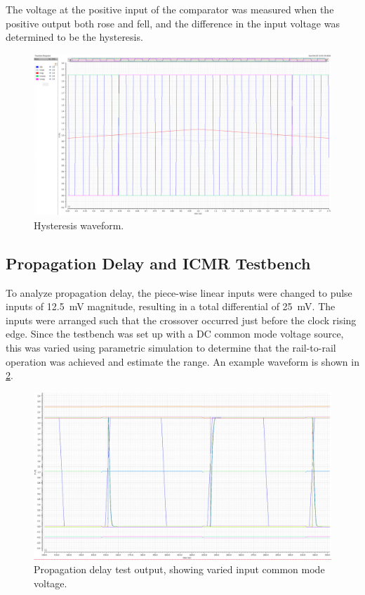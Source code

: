 \documentclass[11pt,letterpaper]{article}
\begin{document}
The voltage at the positive input of the comparator was measured when the positive output both rose and fell, and the difference in the input voltage was determined to be the hysteresis.

\begin{figure}[!t]
    \centering
    \includegraphics[width=\textwidth]{images/hyst_plot.png}
    \caption{Hysteresis waveform.}
    \label{fig:hyst-plot}
\end{figure}

\subsection{Propagation Delay and ICMR Testbench}

To analyze propagation delay, the piece-wise linear inputs were changed to pulse inputs of \qty{12.5}{\mV} magnitude, resulting in a total differential of \qty{25}{\mV}. The inputs were arranged such that the crossover occurred just before the clock rising edge. Since the testbench was set up with a DC common mode voltage source, this was varied using parametric simulation to determine that the rail-to-rail operation was achieved and estimate the range. An example waveform is shown in \cref{fig:prop-plot}.

\begin{figure}[htbp!]
    \centering
    \includegraphics[width=\textwidth]{images/prop_icmr.png}
    \caption{Propagation delay test output, showing varied input common mode voltage.}
    \label{fig:prop-plot}
\end{figure}
\end{document}
